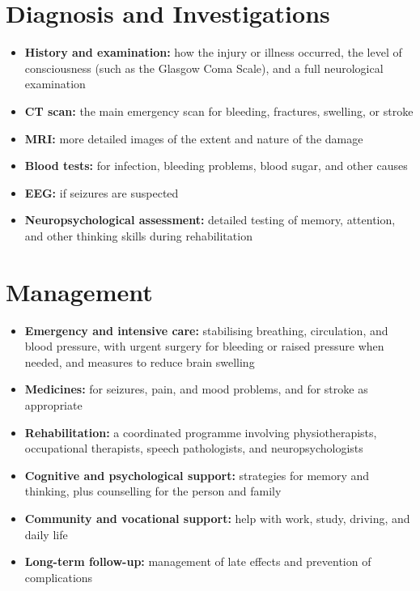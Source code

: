 \section*{Diagnosis and Investigations}
\begin{itemize}
    \item \textbf{History and examination:} how the injury or illness occurred, the level of consciousness (such as the Glasgow Coma Scale), and a full neurological examination
    \item \textbf{CT scan:} the main emergency scan for bleeding, fractures, swelling, or stroke
    \item \textbf{MRI:} more detailed images of the extent and nature of the damage
    \item \textbf{Blood tests:} for infection, bleeding problems, blood sugar, and other causes
    \item \textbf{EEG:} if seizures are suspected
    \item \textbf{Neuropsychological assessment:} detailed testing of memory, attention, and other thinking skills during rehabilitation
\end{itemize}

\section*{Management}
\begin{itemize}
    \item \textbf{Emergency and intensive care:} stabilising breathing, circulation, and blood pressure, with urgent surgery for bleeding or raised pressure when needed, and measures to reduce brain swelling
    \item \textbf{Medicines:} for seizures, pain, and mood problems, and for stroke as appropriate
    \item \textbf{Rehabilitation:} a coordinated programme involving physiotherapists, occupational therapists, speech pathologists, and neuropsychologists
    \item \textbf{Cognitive and psychological support:} strategies for memory and thinking, plus counselling for the person and family
    \item \textbf{Community and vocational support:} help with work, study, driving, and daily life
    \item \textbf{Long-term follow-up:} management of late effects and prevention of complications
\end{itemize}

